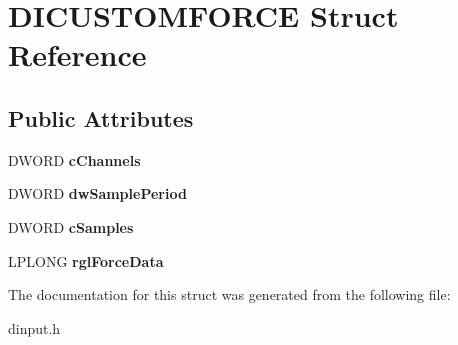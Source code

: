 \hypertarget{struct_d_i_c_u_s_t_o_m_f_o_r_c_e}{\section{D\-I\-C\-U\-S\-T\-O\-M\-F\-O\-R\-C\-E Struct Reference}
\label{struct_d_i_c_u_s_t_o_m_f_o_r_c_e}
}
\subsection*{Public Attributes}
\begin{DoxyCompactItemize}
\item 
\hypertarget{struct_d_i_c_u_s_t_o_m_f_o_r_c_e_abc5a17bc4ab35ee7874d7cb1e478ebfa}{D\-W\-O\-R\-D {\bfseries c\-Channels}}\label{struct_d_i_c_u_s_t_o_m_f_o_r_c_e_abc5a17bc4ab35ee7874d7cb1e478ebfa}

\item 
\hypertarget{struct_d_i_c_u_s_t_o_m_f_o_r_c_e_a2d1d39ef900d1fb0a4dc4bcfb39e1e53}{D\-W\-O\-R\-D {\bfseries dw\-Sample\-Period}}\label{struct_d_i_c_u_s_t_o_m_f_o_r_c_e_a2d1d39ef900d1fb0a4dc4bcfb39e1e53}

\item 
\hypertarget{struct_d_i_c_u_s_t_o_m_f_o_r_c_e_aed380c058885431ab00f2749524a9f04}{D\-W\-O\-R\-D {\bfseries c\-Samples}}\label{struct_d_i_c_u_s_t_o_m_f_o_r_c_e_aed380c058885431ab00f2749524a9f04}

\item 
\hypertarget{struct_d_i_c_u_s_t_o_m_f_o_r_c_e_a551e9b00404984a9e6025bc65c92a0a9}{L\-P\-L\-O\-N\-G {\bfseries rgl\-Force\-Data}}\label{struct_d_i_c_u_s_t_o_m_f_o_r_c_e_a551e9b00404984a9e6025bc65c92a0a9}

\end{DoxyCompactItemize}


The documentation for this struct was generated from the following file\-:\begin{DoxyCompactItemize}
\item 
dinput.\-h\end{DoxyCompactItemize}
